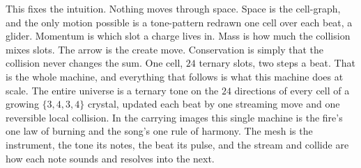 This fixes the intuition. Nothing moves through space. Space is the cell-graph, and the only motion possible is a
tone-pattern redrawn one cell over each beat, a glider. Momentum is which slot a charge lives in. Mass is how
much the collision mixes slots. The arrow is the create move. Conservation is simply that the collision never
changes the sum. One cell, $24$ ternary slots, two steps a beat. That is the whole machine, and everything that
follows is what this machine does at scale. The entire universe is a ternary tone on the $24$ directions of every
cell of a growing $\{3,4,3,4\}$ crystal, updated each beat by one streaming move and one reversible local
collision. In the carrying images this single machine is the fire's one law of burning and the song's one rule of
harmony. The mesh is the instrument, the tone its notes, the beat its pulse, and the stream and collide are how
each note sounds and resolves into the next.

